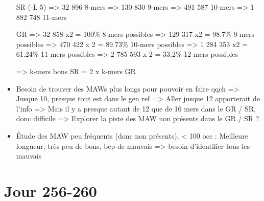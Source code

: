 \documentclass[12pt]{report}
\begin{document}
\begin{itemize}
		  SR (-L 5) => 32 896 8-mers 
		  		   => 130 830 9-mers
		  		   => 491 587 10-mers
				   => 1 882 748 11-mers

		  GR => 32 858 x2 = 100\% 8-mers possibles
		     => 129 317 x2 = 98.7\% 9-mers possibles
		     => 470 422 x 2 = 89.73\% 10-mers possibles
		     => 1 284 353 x2 = 61.24\% 11-mers possibles
		     => 2 785 593 x 2 = 33.2\% 12-mers possibles
		     
		 => k-mers bons SR = 2 x k-mers GR
		  
	\item Besoin de trouver des MAWs plus longs pour pouvoir en faire qqch
		  => Jusque 10, presque tout est dans le gen ref
		  => Aller jusque 12 apporterait de l'info
		  => Mais il y a presque autant de 12 que de 16 mers dans le GR / SR, donc difficile
		  => Explorer la piste des MAW non présents dans le GR / SR ?
		  
	\item Étude des MAW peu fréquents (donc non présents), < 100 occ : Meilleure longueur, très peu de bons, bcp de mauvais
		  => besoin d'identifier tous les mauvais
\end{itemize}

\section{Jour 256-260}
\end{document}
